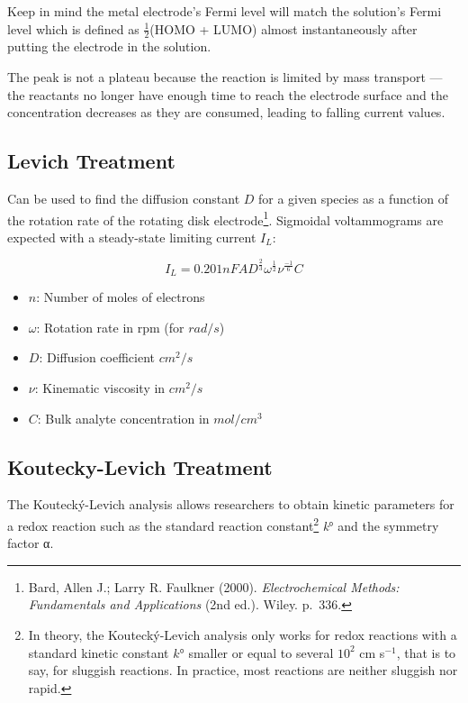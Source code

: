 \documentclass[
  letterpaper,
  DIV=11,
  numbers=noendperiod]{scrartcl}
\providecommand{\tightlist}{%
  \setlength{\itemsep}{0pt}\setlength{\parskip}{0pt}}
\begin{document}
Keep in mind the metal electrode's Fermi level will match the solution's
Fermi level which is defined as \(\frac{1}{2}\)(HOMO + LUMO) almost
instantaneously after putting the electrode in the solution.

The peak is not a plateau because the reaction is limited by mass
transport --- the reactants no longer have enough time to reach the
electrode surface and the concentration decreases as they are consumed,
leading to falling current values.

\subsection{Levich Treatment}\label{levich-treatment}

Can be used to find the diffusion constant \(D\) for a given species as
a function of the rotation rate of the rotating disk
electrode\footnote{Bard, Allen J.; Larry R. Faulkner (2000).
  \emph{Electrochemical Methods: Fundamentals and Applications} (2nd
  ed.). Wiley. p.~336.}. Sigmoidal voltammograms are expected with a
steady-state limiting current \(I_L\):

\[
I_L = 0.201 n F A D^\frac{2}{3}\omega^\frac{1}{2}\nu^\frac{-1}{6} C
\]

\begin{itemize}
\tightlist
\item
  \(n\): Number of moles of electrons
\item
  \(\omega\): Rotation rate in rpm (for \(rad/s\))
\item
  \(D\): Diffusion coefficient \(cm^2/s\)
\item
  \(\nu\): Kinematic viscosity in \(cm^2/s\)
\item
  \(C\): Bulk analyte concentration in \(mol/cm^3\)
\end{itemize}

\subsection{Koutecky-Levich Treatment}\label{koutecky-levich-treatment}

The Koutecký-Levich analysis allows researchers to obtain kinetic
parameters for a redox reaction such as the standard reaction
constant\footnote{In theory, the Koutecký-Levich analysis only works for
  redox reactions with a standard kinetic constant \(k°\) smaller or
  equal to several \(10^2\) cm s\(^{-1}\), that is to say, for sluggish
  reactions. In practice, most reactions are neither sluggish nor rapid.}
\emph{k}° and the symmetry factor α.
\end{document}
